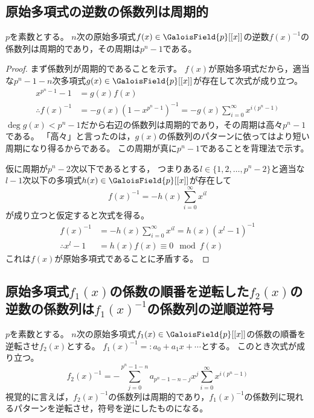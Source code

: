         \subsection{原始多項式の逆数の係数列は周期的}
            \label{原始多項式の逆数の係数列は周期的}
            \begin{shadebox}
                $p$を素数とする。
                $n$次の原始多項式$f(x) \in \GaloisField{p}[[x]]$の逆数$f(x)^{-1}$の係数列は周期的であり，その周期は$p^n-1$である。
            \end{shadebox}
            \begin{proof}
                \quad\par
                まず係数列が周期的であることを示す。
                $f(x)$が原始多項式だから，適当な$p^n-1-n$次多項式$g(x) \in \GaloisField{p}[[x]]$が存在して次式が成り立つ。
                \begin{align*}
                    x^{p^n-1} - 1 &= g(x)f(x) \\
                    \therefore f(x)^{-1} &= -g(x)\left(1 - x^{p^n-1}\right)^{-1} = -g(x) \sum_{i=0}^\infty x^{i(p^n-1)}
                \end{align*}
                $\deg{g(x)} < p^n - 1$だから右辺の係数列は周期的であり，その周期は高々$p^n-1$である。
                「高々」と言ったのは，$g(x)$の係数列のパターンに依ってはより短い周期になり得るからである。
                この周期が真に$p^n-1$であることを背理法で示す。
                \par
                仮に周期が$p^n-2$次以下であるとする，
                つまりある$l\in\{1,2,\dotsc,p^n-2\}$と適当な$l-1$次以下の多項式$h(x) \in \GaloisField{p}[[x]]$が存在して
                \[ f(x)^{-1} = -h(x) \sum_{i=0}^\infty x^{il} \]
                が成り立つと仮定すると次式を得る。
                \begin{align*}
                    f(x)^{-1} &= -h(x) \sum_{i=0}^\infty x^{il} = h(x)(x^l - 1)^{-1} \\
                    \therefore x^l - 1 &= h(x)f(x) \equiv 0 \mod f(x)
                \end{align*}
                これは$f(x)$が原始多項式であることに矛盾する。
            \end{proof}
        \subsection{原始多項式\texorpdfstring{$f_1(x)$}{f1(x)}の係数の順番を逆転した\texorpdfstring{$f_2(x)$}{f2(x)}の逆数の係数列は\texorpdfstring{$f_1(x)^{-1}$}{1/f1(x)}の係数列の逆順逆符号}
            \begin{shadebox}
                $p$を素数とする。
                $n$次の原始多項式$f_1(x) \in \GaloisField{p}[[x]]$の係数の順番を逆転させ$f_2(x)$とする。
                $f_1(x)^{-1} =: a_0 + a_1x + \dotsb$とする。
                このとき次式が成り立つ。
                \[ f_2(x)^{-1} = -\sum_{j=0}^{p^n-1-n} a_{p^n-1-n-j}x^j \sum_{i=0}^\infty x^{i(p^n-1)} \]
                視覚的に言えば，$f_2(x)^{-1}$の係数列は周期的であり，$f_1(x)^{-1}$の係数列に現れるパターンを逆転させ，符号を逆にしたものになる。
            \end{shadebox}
